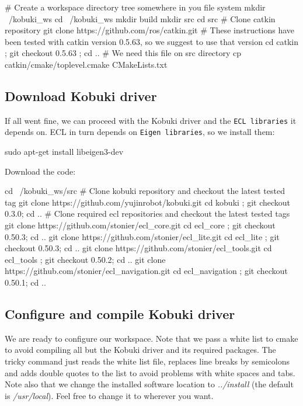 \begin{DoxyCode}
  # Create a workspace directory tree somewhere in you file system
  mkdir ~/kobuki_ws
  cd ~/kobuki_ws
  mkdir build
  mkdir src
  cd src
  # Clone catkin repository
  git clone https://github.com/ros/catkin.git
  # These instructions have been tested with catkin version 0.5.63, so we
       suggest to use that version
  cd catkin ; git checkout 0.5.63 ; cd ..
  # We need this file on src directory
  cp catkin/cmake/toplevel.cmake CMakeLists.txt
\end{DoxyCode}
\subsection{\-Download Kobuki driver}\label{enInstallationLinuxGuide_download}
\-If all went fine, we can proceed with the \-Kobuki driver and the {\tt \-E\-C\-L libraries} it depends on. \-E\-C\-L in turn depends on {\tt \-Eigen libraries}, so we install them\-:


\begin{DoxyCode}
  sudo apt-get install libeigen3-dev 
\end{DoxyCode}


\-Download the code\-:


\begin{DoxyCode}
  cd ~/kobuki_ws/src
  # Clone kobuki repository and checkout the latest tested tag
  git clone https://github.com/yujinrobot/kobuki.git
  cd kobuki         ; git checkout 0.3.0;  cd ..
  # Clone required ecl repositories and checkout the latest tested tags
  git clone https://github.com/stonier/ecl_core.git
  cd ecl_core       ; git checkout 0.50.3; cd ..
  git clone https://github.com/stonier/ecl_lite.git
  cd ecl_lite       ; git checkout 0.50.3; cd ..
  git clone https://github.com/stonier/ecl_tools.git
  cd ecl_tools      ; git checkout 0.50.2; cd ..
  git clone https://github.com/stonier/ecl_navigation.git
  cd ecl_navigation ; git checkout 0.50.1; cd ..
\end{DoxyCode}
\subsection{\-Configure and compile Kobuki driver}\label{enInstallationLinuxGuide_config}
\-We are ready to configure our workspace. \-Note that we pass a white list to cmake to avoid compiling all but the \-Kobuki driver and its required packages. \-The tricky command just reads the white list file, replaces line breaks by semicolons and adds double quotes to the list to avoid problems with white spaces and tabs. \-Note also that we change the installed software location to {\itshape ../install\/} (the default is {\itshape /usr/local\/}). \-Feel free to change it to wherever you want.

